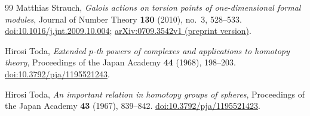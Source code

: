 \begin{thebibliography}{99}
Matthias Strauch,
\emph{Galois actions on torsion points of one-dimensional formal modules},
Journal of Number Theory \textbf{130} (2010), no.~3, 528--533.
\href{https://doi.org/10.1016/j.jnt.2009.10.004}{doi:10.1016/j.jnt.2009.10.004};
\href{https://arxiv.org/abs/0709.3542v1}{arXiv:0709.3542v1 (preprint version)}.

Hirosi Toda,
\emph{Extended $p$-th powers of complexes and applications to homotopy theory},
Proceedings of the Japan Academy \textbf{44} (1968), 198--203.
\href{https://doi.org/10.3792/pja/1195521243}{doi:10.3792/pja/1195521243}.

Hirosi Toda,
\emph{An important relation in homotopy groups of spheres},
Proceedings of the Japan Academy \textbf{43} (1967), 839--842.
\href{https://doi.org/10.3792/pja/1195521423}{doi:10.3792/pja/1195521423}.

\end{thebibliography}
